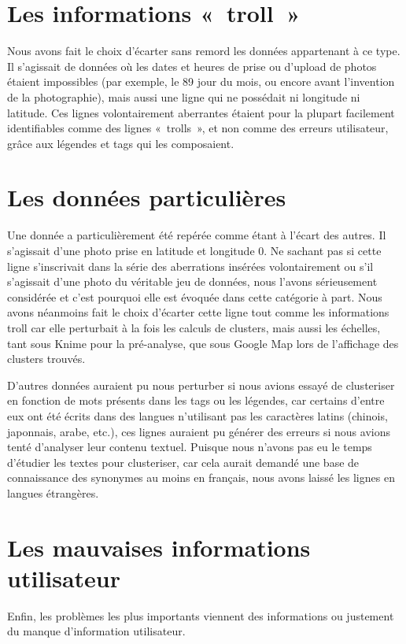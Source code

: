 \section{Les informations «~troll~»}
Nous avons fait le choix d'écarter sans remord les données appartenant à ce type.
Il s'agissait de données où les dates et heures de prise ou d'upload de photos étaient impossibles (par exemple, le 89 jour du mois, ou encore avant l'invention de la photographie), mais aussi une ligne qui ne possédait ni longitude ni latitude.
Ces lignes volontairement aberrantes étaient pour la plupart facilement identifiables comme des lignes «~trolls~», et non comme des erreurs utilisateur, grâce aux légendes et tags qui les composaient.

\section{Les données particulières}
Une donnée a particulièrement été repérée comme étant à l'écart des autres. Il s'agissait d'une photo prise en latitude et longitude 0. Ne sachant pas si cette ligne s'inscrivait dans la série des aberrations insérées volontairement ou s'il s'agissait d'une photo du véritable jeu de données, nous l'avons sérieusement considérée et c'est pourquoi elle est évoquée dans cette catégorie à part.
Nous avons néanmoins fait le choix d'écarter cette ligne tout comme les informations troll car elle perturbait à la fois les calculs de clusters, mais aussi les échelles, tant sous Knime pour la pré-analyse, que sous Google Map lors de l'affichage des clusters trouvés.

D'autres données auraient pu nous perturber si nous avions essayé de clusteriser en fonction de mots présents dans les tags ou les légendes, car certains d'entre eux ont été écrits dans des langues n'utilisant pas les caractères latins (chinois, japonnais, arabe, etc.), ces lignes auraient pu générer des erreurs si nous avions tenté d'analyser leur contenu textuel. Puisque nous n'avons pas eu le temps d'étudier les textes pour clusteriser, car cela aurait demandé une base de connaissance des synonymes au moins en français, nous avons laissé les lignes en langues étrangères.

\section{Les mauvaises informations utilisateur}
Enfin, les problèmes les plus importants viennent des informations ou justement du manque d'information utilisateur.

